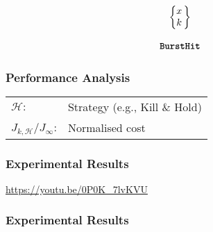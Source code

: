 \begin{frame}
    \vspace{1cm}

    \large
    \begin{equation*}
        \begin{matrix}
            \left\{\begin{matrix}
                x \\
                k
            \end{matrix}\,\right\} \\
                                 \\
            \texttt{\textbf{BurstHit}}
        \end{matrix}
    \end{equation*}
\end{frame}


\begin{frame}
    \frametitle{Performance Analysis}
    \begin{figure}[h]
        \centering
        
    \end{figure}

    \centering
    \begin{tabular}{l l}
        $\mathcal{H}:$ & Strategy (e.g., Kill \& Hold)\\
        $J_{k,\mathcal{H}}/J_\infty$: & Normalised cost \\
    \end{tabular}
\end{frame}




\begin{frame}
    \frametitle{Experimental Results}
    \centering
    \LARGE
    \textcolor{hicolour}{\url{https://youtu.be/0P0K_7lvKVU}}
\end{frame}


\begin{frame}
    \frametitle{Experimental Results}
    \begin{figure}[h]
        \centering
        \resizebox{0.85\textwidth}{!}{}
    \end{figure}
\end{frame}
